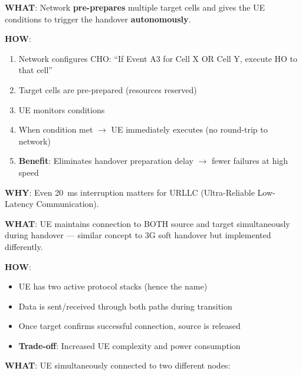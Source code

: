 \textbf{WHAT}: Network \textbf{pre-prepares} multiple target cells and gives the UE conditions to trigger the handover \textbf{autonomously}.


\textbf{HOW}:

\begin{enumerate}
\def\labelenumi{\arabic{enumi}.}
\tightlist
\item
  Network configures CHO: ``If Event A3 for Cell X OR Cell Y, execute HO to that cell''
\item
  Target cells are pre-prepared (resources reserved)
\item
  UE monitors conditions
\item
  When condition met \ensuremath{\to} UE immediately executes (no round-trip to network)
\item
  \textbf{Benefit}: Eliminates handover preparation delay \ensuremath{\to} fewer failures at high speed
\end{enumerate}



\textbf{WHY}: Even 20~ms interruption matters for URLLC (Ultra-Reliable Low-Latency Communication).

\textbf{WHAT}: UE maintains connection to BOTH source and target simultaneously during handover — similar concept to 3G soft handover but implemented differently.


\textbf{HOW}:

\begin{itemize}
\tightlist
\item
  UE has two active protocol stacks (hence the name)
\item
  Data is sent/\allowbreak{}received through both paths during transition
\item
  Once target confirms successful connection, source is released
\item
  \textbf{Trade-off}: Increased UE complexity and power consumption
\end{itemize}


\textbf{WHAT}: UE simultaneously connected to two different nodes:

